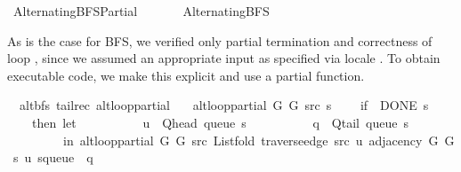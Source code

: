 %
\begin{isabellebody}%
%
%
\isadelimdocument
%
\endisadelimdocument
%
\isatagdocument
%
\isamarkuptrue%
%
\endisatagdocument
{\isafolddocument}%
%
\isadelimdocument
%
\endisadelimdocument
%
\isadelimtheory
%
\endisadelimtheory
%
\isatagtheory
{}\isamarkupfalse%
\ Alternating{\isacharunderscore}{\kern0pt}BFS{\isacharunderscore}{\kern0pt}Partial\isanewline
\ \ \isanewline
\ \ \ \ Alternating{\isacharunderscore}{\kern0pt}BFS\isanewline
{}%
\endisatagtheory
{\isafoldtheory}%
%
\isadelimtheory
%
\endisadelimtheory
%
\begin{isamarkuptext}%
As is the case for BFS, we verified only partial termination and correctness of loop
, since we assumed an appropriate input as specified via locale
. To obtain executable code, we make this explicit and use a partial
function.%
\end{isamarkuptext}\isamarkuptrue%
\isamarkupfalse%
\ {\isacharparenleft}{\kern0pt}\ alt{\isacharunderscore}{\kern0pt}bfs{\isacharparenright}{\kern0pt}\ {\isacharparenleft}{\kern0pt}tailrec{\isacharparenright}{\kern0pt}\ alt{\isacharunderscore}{\kern0pt}loop{\isacharunderscore}{\kern0pt}partial\ \isanewline
\ \ {\isachardoublequoteopen}alt{\isacharunderscore}{\kern0pt}loop{\isacharunderscore}{\kern0pt}partial\ G{}\ G{}\ src\ s\ {\isacharequal}{\kern0pt}\isanewline
\ \ \ {\isacharparenleft}{\kern0pt}if\ {\isasymnot}\ DONE\ s\isanewline
\ \ \ \ then\ let\isanewline
\ \ \ \ \ \ \ \ \ \ u\ {\isacharequal}{\kern0pt}\ Q{\isacharunderscore}{\kern0pt}head\ {\isacharparenleft}{\kern0pt}queue\ s{\isacharparenright}{\kern0pt}{\isacharsemicolon}{\kern0pt}\isanewline
\ \ \ \ \ \ \ \ \ \ q\ {\isacharequal}{\kern0pt}\ Q{\isacharunderscore}{\kern0pt}tail\ {\isacharparenleft}{\kern0pt}queue\ s{\isacharparenright}{\kern0pt}\isanewline
\ \ \ \ \ \ \ \ \ in\ alt{\isacharunderscore}{\kern0pt}loop{\isacharunderscore}{\kern0pt}partial\ G{}\ G{}\ src\ {\isacharparenleft}{\kern0pt}List{\isachardot}{\kern0pt}fold\ {\isacharparenleft}{\kern0pt}traverse{\isacharunderscore}{\kern0pt}edge\ src\ u{\isacharparenright}{\kern0pt}\ {\isacharparenleft}{\kern0pt}adjacency\ G{}\ G{}\ s\ u{\isacharparenright}{\kern0pt}\ {\isacharparenleft}{\kern0pt}s{\isasymlparr}queue\ {\isacharcolon}{\kern0pt}{\isacharequal}{\kern0pt}\ q{\isasymrparr}{\isacharparenright}{\kern0pt}{\isacharparenright}{\kern0pt}\isanewline

\end{isabellebody}
